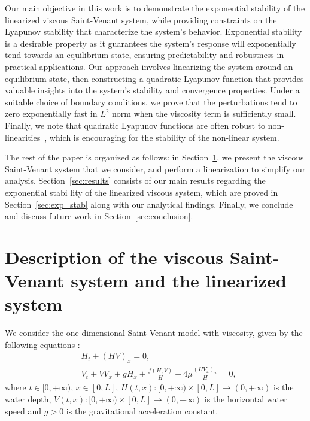 \documentclass[11pt]{article}
\begin{document}
Our main objective in this work is to demonstrate the exponential stability of the linearized viscous Saint-Venant system, while providing constraints on the Lyapunov stability that characterize the system's behavior. Exponential stability is a desirable property as it guarantees the system's response will exponentially tend towards an equilibrium state, ensuring predictability and robustness in practical applications. Our approach involves linearizing the system around an equilibrium state, then constructing a quadratic Lyapunov function that provides valuable insights into the system's stability and convergence properties. Under a suitable choice of boundary conditions, we prove that the perturbations tend to zero exponentially fast in $L^2$ norm when the viscosity term is sufficiently small. Finally, we note that quadratic Lyapunov functions are often robust to non-linearities~\cite{bastin2016stability,hayat2023pi}, which is encouraging for the stability of the non-linear system.

The rest of the paper is organized as follows: in Section~\ref{sec:description}, we present the viscous Saint-Venant system that we consider, and perform a linearization to simplify our analysis. Section~\ref{sec:results} consists of our main results regarding the exponential stabi lity of the linearized viscous system, which are proved in Section~\ref{sec:exp_stab} along with our analytical findings. Finally, we conclude and discuss future work in Section~\ref{sec:conclusion}.

\section{Description of the viscous Saint-Venant system and the linearized system}
\label{sec:description} 

We consider the one-dimensional Saint-Venant model with viscosity, given by the following equations \cite{gerbeau2000derivation}:
\begin{align}
&H_t + (HV)_x = 0,
\label{eq:sv_nonlinear_1} \\
&\displaystyle V_t + VV_x + gH_x + \frac{f(H, V)}{H} - 4 \mu  \frac{(HV_x)_x}{H} = 0,
\label{eq:sv_nonlinear_2}
\end{align}
where $t \in [0, +\infty)$, $x \in [0,L]$, $H(t,x) : [0,+\infty) \times [0,L] \to (0,+\infty)$ is the water depth, $V(t,x) : [0,+\infty) \times [0,L] \to (0,+\infty)$ is the horizontal water speed and $g>0$ is the gravitational acceleration constant. 
\end{document}
